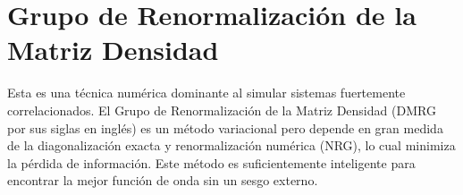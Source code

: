 \section{Grupo de Renormalización de la Matriz Densidad}

Esta es una técnica numérica dominante al simular sistemas fuertemente correlacionados. El Grupo de Renormalización de la Matriz Densidad (DMRG por sus siglas en inglés) es un método variacional pero depende en gran medida de la diagonalización exacta y renormalización numérica (NRG), lo cual minimiza la pérdida de información. Este método es suficientemente inteligente para encontrar la mejor función de onda sin un sesgo externo.

